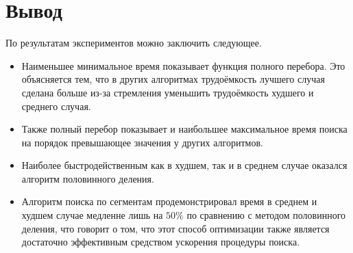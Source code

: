 \section*{Вывод}
По результатам экспериментов можно заключить следующее.
\begin{itemize}
	\item Наименьшее минимальное время показывает функция полного перебора. Это объясняется тем, что в других алгоритмах трудоёмкость лучшего случая сделана больше из-за стремления уменьшить трудоёмкость худшего и среднего случая.
	\item Также полный перебор показывает и наибольшее максимальное время поиска на порядок превышающее значения у других алгоритмов.
	\item Наиболее быстродейственным как в худшем, так и в среднем случае оказался алгоритм половинного деления.
	\item Алгоритм поиска по сегментам продемонстрировал время в среднем и худшем случае медленне лишь на $50\%$ по сравнению с методом половинного деления, что говорит о том, что этот способ оптимизации также является достаточно эффективным средством ускорения процедуры поиска.
\end{itemize}


	